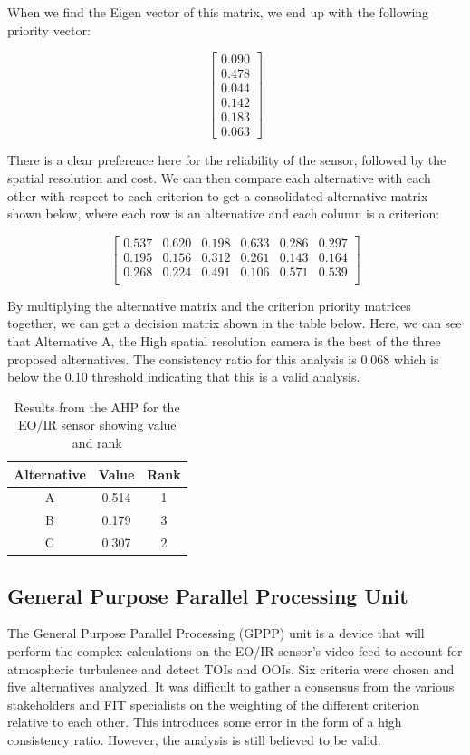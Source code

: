 When we find the Eigen vector of this matrix, we end up with the following priority vector:

\[
\left[ {\begin{array}{cc}
0.090 \\
0.478 \\
0.044 \\
0.142 \\
0.183 \\
0.063
\end{array} } \right]
\]

There is a clear preference here for the reliability of the sensor, followed by the spatial resolution and cost. We can then compare each alternative with each other with respect to each criterion to get a consolidated alternative matrix shown below, where each row is an alternative and each column is a criterion:

\[ 
\left[ {\begin{array}{cccccc}
0.537 & 0.620 & 0.198 & 0.633 & 0.286 & 0.297 \\
0.195 & 0.156 & 0.312 & 0.261 & 0.143 & 0.164 \\
0.268 & 0.224 & 0.491 & 0.106 & 0.571 & 0.539 \\
\end{array} } \right]
\]

By multiplying the alternative matrix and the criterion priority matrices together, we can get a decision matrix shown in the table below. Here, we can see that Alternative A, the High spatial resolution camera is the best of the three proposed alternatives. The consistency ratio for this analysis is 0.068 which is below the 0.10 threshold indicating that this is a valid analysis.

\begin{table}[]
    \centering
    \begin{tabular}{|c|c|c|}
        \hline
        \textbf{Alternative} & \textbf{Value} & \textbf{Rank} \\
        \hline
        A & 0.514 & 1 \\ \hline
        B & 0.179 & 3 \\ \hline
        C & 0.307 & 2 \\ \hline
    \end{tabular}
    \caption{Results from the AHP for the EO/IR sensor showing value and rank}
    \label{tab:eoir_ahp_results}
\end{table}

\subsection{General Purpose Parallel Processing Unit}
The General Purpose Parallel Processing (GPPP) unit is a device that will perform the complex calculations on the EO/IR sensor's video feed to account for atmospheric turbulence and detect TOIs and OOIs. Six criteria were chosen and five alternatives analyzed. It was difficult to gather a consensus from the various stakeholders and FIT specialists on the weighting of the different criterion relative to each other. This introduces some error in the form of a high consistency ratio. However, the analysis is still believed to be valid.

